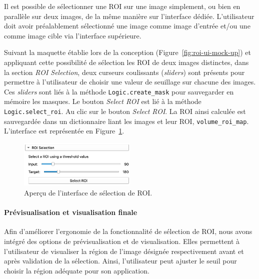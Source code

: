 \documentclass{article}
\newcommand{\subsubsubsection}[1]{\paragraph{#1}\par\noindent\bigskip}
\begin{document}
{{{            \bigskip

            Il est possible de sélectionner une ROI sur une image simplement, ou bien en parallèle sur deux images, de la même manière sur l'interface dédiée. L'utilisateur doit avoir préalablement sélectionné une image comme image d'entrée et/ou une comme image cible via l'interface supérieure.

            Suivant la maquette établie lors de la conception (Figure~\ref{fig:roi-ui-mock-up}) et appliquant cette possibilité de sélection les ROI de deux images distinctes, dans la section \textit{ROI Selection}, deux curseurs coulissants (\textit{sliders}) sont présents pour permettre à l'utilisateur de choisir une valeur de seuillage sur chacune des images. Ces \textit{sliders} sont liés à la méthode \texttt{Logic.create\_mask} pour sauvegarder en mémoire les masques. Le bouton \textit{Select ROI} est lié à la méthode \texttt{Logic.select\_roi}.  Au clic sur le bouton \textit{Select ROI}. La ROI ainsi calculée est sauvegardée dans un dictionnaire liant les images et leur ROI, \texttt{volume\_roi\_map}. L'interface est représentée en Figure~\ref{fig:roi-selection-ui}.

            \begin{figure}[!ht]
                \centering
                \includegraphics[width=0.5\textwidth]{images/roi-selection-ui.png}
                \caption{Aperçu de l'interface de sélection de ROI.}
                \label{fig:roi-selection-ui}
            \end{figure}

            {
                \subsubsubsection{Prévisualisation et visualisation finale}

                Afin d'améliorer l'ergonomie de la fonctionnalité de sélection de ROI, nous avons intégré des options de prévisualisation et de visualisation. Elles permettent à l'utilisateur de visualiser la région de l'image désignée respectivement avant et après validation de la sélection. Ainsi, l'utilisateur peut ajuster le seuil pour choisir la région adéquate pour son application.

                \bigskip

}}}}
\end{document}
